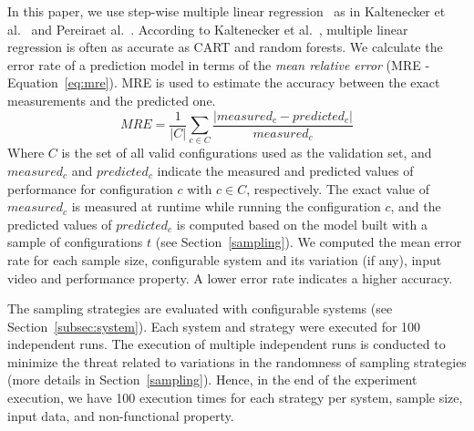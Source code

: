 In this paper, we use step-wise multiple linear regression~\cite{siegmund2015FSE} as in Kaltenecker et al.~\cite{kaltenecker2019} and Pereiraet al.~\cite{pereira2020}. According to Kaltenecker et al.~\cite{kaltenecker2019}, multiple linear regression is often as accurate as CART and random forests.
We calculate the error rate of a prediction model in terms of the \textit{mean relative error} (MRE - Equation~\ref{eq:mre}).
MRE is used to estimate the accuracy between the exact measurements and the predicted one.
\begin{equation}
    MRE = \frac{1}{|C|} \sum_{c \in C} \frac{|measured_{c} - predicted_{c}|}{measured_{c}}
    \label{eq:mre}
\end{equation}
Where $C$ is the set of all valid configurations used as the validation set, and $measured_{c}$ and $predicted_{c}$ indicate the measured and predicted values of performance for configuration $c$ with $c \in C$, respectively.
The exact value of $measured_{c}$ is measured at runtime while running the configuration $c$, and the predicted values of $predicted_{c}$ is computed based on the model built with a sample of configurations $t$ (see Section~\ref{sampling}).
We computed the mean error rate for each sample size, configurable system and its variation (if any), \eg input video and performance property. A lower error rate indicates a higher accuracy.

The sampling strategies are evaluated with  configurable systems (see Section~\ref{subsec:system}).
Each system and strategy were executed for 100 independent runs. The execution of multiple independent runs is conducted to 
minimize the threat related to variations in the randomness of sampling strategies (more details in Section~\ref{sampling}).
Hence, in the end of the experiment execution, we have 100 execution times for each strategy per system, sample size, input data, and non-functional property.
